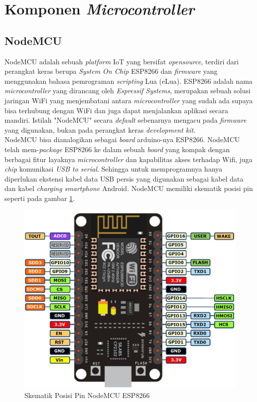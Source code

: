 \section{Komponen \textit{Microcontroller}}

\subsection{NodeMCU}
\tab NodeMCU adalah sebuah \textit{platform} IoT yang bersifat \textit{opensource}, terdiri dari perangkat keras berupa \textit{System On Chip} ESP8266 dan \textit{firmware} yang menggunakan bahasa pemrograman \textit{scripting} Lua (eLua). ESP8266 adalah nama \textit{microcontroller} yang dirancang oleh \textit{Espressif Systems}, merupakan sebuah solusi jaringan WiFi yang menjembatani antara \textit{microcontroller} yang sudah ada supaya bisa terhubung dengan WiFi dan juga dapat menjalankan aplikasi secara mandiri. Istilah "NodeMCU" secara \textit{default} sebenarnya mengacu pada \textit{firmware} yang digunakan, bukan pada perangkat keras \textit{development kit}.\\
\tab NodeMCU bisa dianalogikan sebagai \textit{board} arduino-nya ESP8266. NodeMCU telah mem-\textit{package} ESP8266 ke dalam sebuah \textit{board} yang kompak dengan berbagai fitur layaknya \textit{microcontroller} dan kapabilitas akses terhadap Wifi, juga \textit{chip} komunikasi \textit{USB to serial}. Sehingga untuk memprogramnya hanya diperlukan ekstensi kabel data USB persis yang digunakan sebagai kabel data dan kabel \textit{charging smartphone} Android. NodeMCU memiliki skematik posisi pin seperti pada gambar \ref{figure:pinout-nodemcu}.

\begin{figure}[H]
	\centerline {
		\includegraphics[width=\linewidth]{bab3/img/pinout-nodemcu.png}
	}
	\caption{Skematik Posisi Pin NodeMCU ESP8266}
	\label{figure:pinout-nodemcu}
\end{figure}

